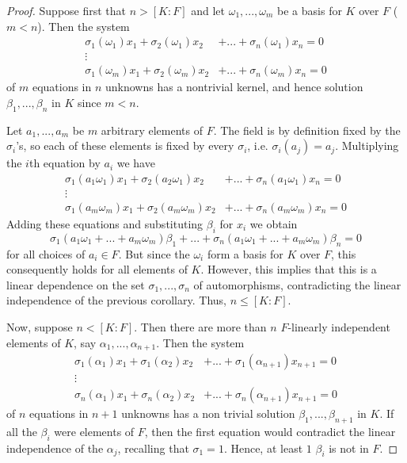 \documentclass[12pt, a4paper, oneside, openright, titlepage]{book}
\begin{document}
\begin{proof}
    Suppose first that $n > [K:F]$ and let $\omega_1,...,\omega_m$ be a basis for $K$ over $F$ ($m < n$). Then the system \begin{align*}
        \sigma_1(\omega_1)x_1 + \sigma_2(\omega_1)x_2&+...+\sigma_n(\omega_1)x_n = 0 \\
        \vdots& \\
        \sigma_1(\omega_m)x_1 + \sigma_2(\omega_m)x_2&+...+\sigma_n(\omega_m)x_n = 0 
    \end{align*}
    of $m$ equations in $n$ unknowns has a nontrivial kernel, and hence solution $\beta_1,...,\beta_n$ in $K$ since $m < n$. 

    Let $a_1,...,a_m$ be $m$ arbitrary elements of $F$. The field is by definition fixed by the $\sigma_i$'s, so each of these elements is fixed by every $\sigma_i$, i.e. $\sigma_i(a_j) = a_j$. Multiplying the $i$th equation by $a_i$ we have
    \begin{align*}
        \sigma_1(a_1\omega_1)x_1 + \sigma_2(a_2\omega_1)x_2&+...+\sigma_n(a_1\omega_1)x_n = 0 \\
        \vdots& \\
        \sigma_1(a_m\omega_m)x_1 + \sigma_2(a_m\omega_m)x_2&+...+\sigma_n(a_m\omega_m)x_n = 0 
    \end{align*}
    Adding these equations and substituting $\beta_i$ for $x_i$ we obtain \begin{equation*}
        \sigma_1(a_1\omega_1+...+a_m\omega_m)\beta_1+...+\sigma_n(a_1\omega_1+...+a_m\omega_m)\beta_n = 0
    \end{equation*}
    for all choices of $a_i \in F$. But since the $\omega_i$ form a basis for $K$ over $F$, this consequently holds for all elements of $K$. However, this implies that this is a linear dependence on the set $\sigma_1,...,\sigma_n$ of automorphisms, contradicting the linear independence of the previous corollary. Thus, $n \leq [K:F]$. 

    Now, suppose $n < [K:F]$. Then there are more than $n$ $F$-linearly independent elements of $K$, say $\alpha_1,...,\alpha_{n+1}$. Then the system 
    \begin{align*}
        \sigma_1(\alpha_1)x_1 + \sigma_1(\alpha_2)x_2&+...+\sigma_1(\alpha_{n+1})x_{n+1} = 0 \\
        \vdots& \\
        \sigma_n(\alpha_1)x_1 + \sigma_n(\alpha_2)x_2&+...+\sigma_n(\alpha_{n+1})x_{n+1} = 0 
    \end{align*}
    of $n$ equations in $n+1$ unknowns has a non trivial solution $\beta_1,...,\beta_{n+1}$ in $K$. If all the $\beta_i$ were elements of $F$, then the first equation would contradict the linear independence of the $\alpha_j$, recalling that $\sigma_1 = 1$. Hence, at least $1$ $\beta_i$ is not in $F$.


\end{proof}
\end{document}
